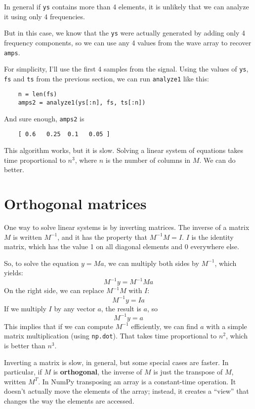 In general if {\tt ys}
contains more than 4 elements, it is unlikely that we can analyze it
using only 4 frequencies.

But in this case, we know that the {\tt ys} were actually generated by
adding only 4 frequency components, so we can use any 4 values from
the wave array to recover {\tt amps}.

For simplicity, I'll use the first 4 samples from the signal.
Using the values of {\tt ys}, {\tt fs} and {\tt ts} from
the previous section, we can run {\tt analyze1} like this:

\begin{verbatim}
	n = len(fs)
	amps2 = analyze1(ys[:n], fs, ts[:n])
\end{verbatim}

And sure enough, {\tt amps2} is

\begin{verbatim}
	[ 0.6   0.25  0.1   0.05 ]
\end{verbatim}

This algorithm works, but it is slow.  Solving a linear
system of equations takes time proportional to $n^3$, where $n$ is
the number of columns in $M$.  We can do better.


\section{Orthogonal matrices}

One way to solve linear systems is by inverting matrices.  The
inverse of a matrix $M$ is written $M^{-1}$, and it has the property
that $M^{-1}M = I$.  $I$ is the identity matrix, which has
the value 1 on all diagonal elements and 0 everywhere else.

So, to solve the equation $y = Ma$, we can multiply both sides by
$M^{-1}$, which yields:
%
\[ M^{-1}y = M^{-1} M a \]
%
On the right side, we can replace $M^{-1}M$ with $I$:
%
\[ M^{-1}y = I a \]
%
If we multiply $I$ by any vector $a$, the result is $a$, so
%
\[ M^{-1}y = a \]
%
This implies that if we can compute $M^{-1}$ efficiently, we can find
$a$ with a simple matrix multiplication (using {\tt np.dot}).  That
takes time proportional to $n^2$, which is better than $n^3$.

Inverting a matrix is slow, in general, but some special cases are
faster.  In particular, if $M$ is {\bf orthogonal}, the inverse of $M$
is just the transpose of $M$, written $M^T$.  In NumPy
transposing an array is a constant-time operation.  It
doesn't actually move the elements of the array; instead, it creates a
``view'' that changes the way the elements are accessed.

